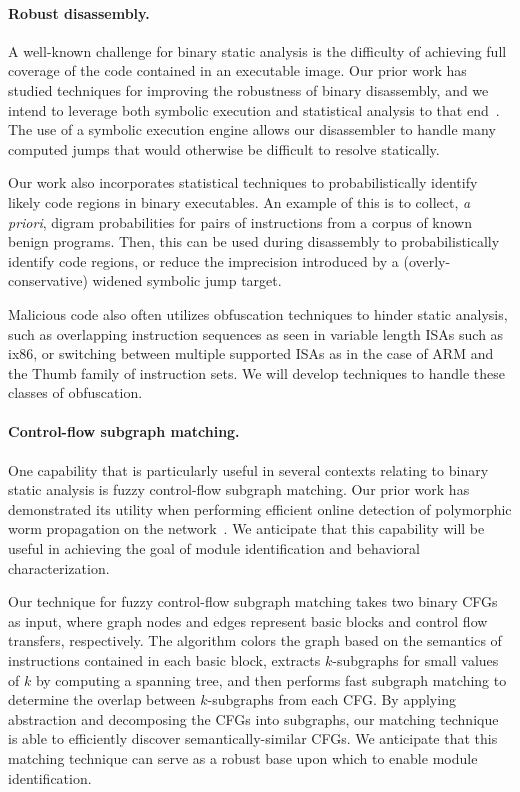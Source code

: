 \documentclass[letterpaper,twoside,11pt,headings=small]{scrartcl}
\begin{document}
\paragraph{Robust disassembly.} A well-known challenge for binary static
analysis is the difficulty of achieving full coverage of the code contained in
an executable image. Our prior work has studied techniques for improving the
robustness of binary disassembly, and we intend to leverage both symbolic
execution and statistical analysis to that end~\cite{kruegel:sec2004:disasm}.
The use of a symbolic execution engine allows our disassembler to handle many
computed jumps that would otherwise be difficult to resolve statically.

Our work also incorporates statistical techniques to probabilistically
identify likely code regions in binary executables.  An example of this is to
collect, \emph{a priori}, digram probabilities for pairs of instructions from
a corpus of known benign programs.  Then, this can be used during disassembly
to probabilistically identify code regions, or reduce the imprecision
introduced by a (overly-conservative) widened symbolic jump target.

Malicious code also often utilizes obfuscation techniques to hinder static
analysis, such as overlapping instruction sequences as seen in variable length
ISAs such as ix86, or switching between multiple supported ISAs as in the case
of ARM and the Thumb family of instruction sets.  We will develop techniques
to handle these classes of obfuscation.

\paragraph{Control-flow subgraph matching.} One capability that is
particularly useful in several contexts relating to binary static analysis is
fuzzy control-flow subgraph matching.  Our prior work has demonstrated its
utility when performing efficient online detection of polymorphic worm
propagation on the network~\cite{kruegel:raid2005:worm}. We anticipate that
this capability will be useful in achieving the goal of module identification
and behavioral characterization.

Our technique for fuzzy control-flow subgraph matching takes two binary CFGs
as input, where graph nodes and edges represent basic blocks and control flow
transfers, respectively.  The algorithm colors the graph based on the
semantics of instructions contained in each basic block, extracts
$k$-subgraphs for small values of $k$ by computing a spanning tree, and then
performs fast subgraph matching to determine the overlap between $k$-subgraphs
from each CFG. By applying abstraction and decomposing the CFGs into
subgraphs, our matching technique is able to efficiently discover
semantically-similar CFGs.  We anticipate that this matching technique can
serve as a robust base upon which to enable module identification.
\end{document}
